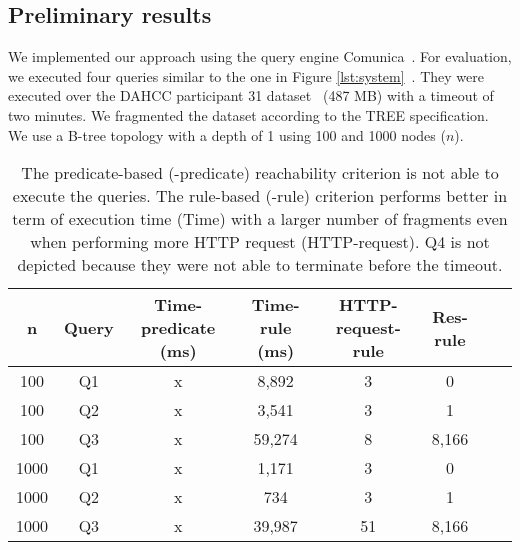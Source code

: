 \subsection{Preliminary results}

We implemented our approach using the query engine Comunica~\cite{comunica}.
For evaluation, we executed four queries similar to the one in Figure \ref{lst:system}~.
They were executed over the DAHCC participant 31 dataset~\cite{dahcc_resource} (487 MB) with a timeout of two minutes.
We fragmented the dataset according to the TREE specification.
We use a B-tree topology with a depth of 1 using 100 and 1000 nodes ($n$).

\begin{table}[ht]
    \centering
    \begin{tabular}{|c|c|c|c|c|c|c|c|}
        \hline
        \textbf{n} & \textbf{Query} & \textbf{Time-predicate (ms)}  & \textbf{Time-rule (ms)} & \textbf{HTTP-request-rule} & \textbf{Res-rule} \\
        \hline
        100 & Q1 & x & 8,892& 3 & 0 \\
        100 & Q2 & x & 3,541& 3 & 1 \\
        100 & Q3 & x & 59,274& 8 & 8,166 \\
        \hhline{|=|=|=|=|=|=|=|=|}
        1000 & Q1 & x & 1,171& 3 & 0 \\
        1000 & Q2 & x & 734& 3 & 1 \\
        1000 & Q3 & x & 39,987& 51 & 8,166 \\
        \hline
    \end{tabular}
    \caption{
    The predicate-based (-predicate) reachability criterion is not able to execute the queries. 
    The rule-based (-rule) criterion performs better in term of execution time (Time) with a larger number of fragments even when performing more HTTP request (HTTP-request).
    Q4 is not depicted because they were not able to terminate before the timeout.
    }
    \label{tab:result}
    \vspace*{-0.15cm}
\end{table}

